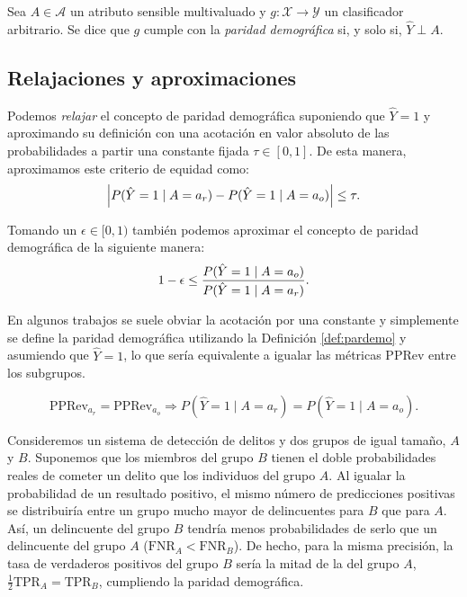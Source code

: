 \documentclass[oneside,openright,titlepage,numbers=noenddot,openany,headinclude,footinclude=true,
cleardoublepage=empty,abstractoff,BCOR=5mm,paper=a4,fontsize=12pt,main=spanish]{scrreprt}
\begin{document}
\begin{definition} \label{def:pardemo}
Sea $A \in \mathcal{A}$ un atributo sensible multivaluado y $g\colon \mathcal{X} \to \mathcal{Y}$ un clasificador arbitrario. Se dice que $g$ cumple con la \textit{paridad demográfica} si, y solo si, $\hat{Y} \perp A.$
\end{definition}

\subsection*{Relajaciones y aproximaciones}

Podemos \textit{relajar} el concepto de paridad demográfica suponiendo que $\hat{Y}=1$ y aproximando su definición con una acotación en valor absoluto de las probabilidades a partir una constante fijada $\tau \in [0,1]$. De esta manera, aproximamos este criterio de equidad como: 
\begin{equation*}
\left\lvert P(\hat{Y}=1 \mid A=a_r)-P(\hat{Y}=1 \mid A=a_o)\right\rvert \leq \tau.
\end{equation*}

Tomando un $\epsilon \in [0,1)$ también podemos aproximar el concepto de paridad demográfica de la siguiente manera:
\begin{equation}\label{eq:p}
   1-\epsilon \leq \frac{\displaystyle P(\hat{Y}=1 \mid A=a_o)}{\displaystyle P(\hat{Y}=1 \mid A=a_r)}. 
\end{equation}

En algunos trabajos se suele obviar la acotación por una constante y simplemente se define la paridad demográfica utilizando la Definición \ref{def:pardemo} y asumiendo que $\hat{Y}=1$, lo que sería equivalente a igualar las métricas PPRev entre los subgrupos.

\begin{equation*}
\text{PPRev}_{a_r}=\text{PPRev}_{a_o} \Rightarrow P(\hat{Y}=1 \mid A=a_r)=P(\hat{Y}=1 \mid A=a_o).
\end{equation*}

\begin{example}
Consideremos un sistema de detección de delitos y dos grupos de igual tamaño, $A$ y $B$. Suponemos que los miembros del grupo $B$ tienen el doble probabilidades reales de cometer un delito que los individuos del grupo $A$. Al igualar la probabilidad de un resultado positivo, el mismo número de predicciones positivas se distribuiría entre un grupo mucho mayor de delincuentes para $B$ que para $A$. Así, un delincuente del grupo $B$ tendría menos probabilidades de serlo que un delincuente del grupo $A$ ($\text{FNR}_A < \text{FNR}_B$). De hecho, para la misma precisión, la tasa de verdaderos positivos del grupo $B$ sería la mitad de la del grupo $A$, $\frac{1}{2} \text{TPR}_A = \text{TPR}_B$, cumpliendo la paridad demográfica.
\end{example}
\end{document}
